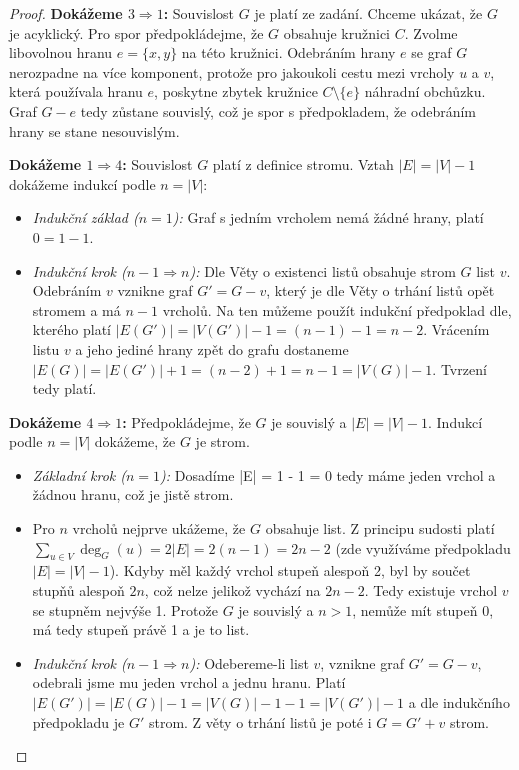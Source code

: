 \begin{proof}
\noindent\textbf{Dokážeme $3 \Rightarrow 1$:}
Souvislost $G$ je platí ze zadání. Chceme ukázat, že $G$ je acyklický. Pro spor předpokládejme, že $G$ obsahuje kružnici $C$. Zvolme libovolnou hranu $e = \{x, y\}$ na této kružnici. Odebráním hrany $e$ se graf $G$ nerozpadne na více komponent, protože pro jakoukoli cestu mezi vrcholy $u$ a $v$, která používala hranu $e$, poskytne zbytek kružnice $C \setminus \{e\}$ náhradní obchůzku. Graf $G - e$ tedy zůstane souvislý, což je spor s předpokladem, že odebráním hrany se stane nesouvislým. 

\bigskip

\noindent\textbf{Dokážeme $1 \Rightarrow 4$:}
Souvislost $G$ platí z definice stromu. Vztah $|E| = |V| - 1$ dokážeme indukcí podle $n = |V|$:
\begin{itemize}
    \item \textit{Indukční základ ($n = 1$):} Graf s jedním vrcholem nemá žádné hrany, platí $0 = 1 - 1$.
    \item \textit{Indukční krok ($n - 1 \Rightarrow n$):} Dle Věty o existenci listů obsahuje strom $G$ list $v$. Odebráním $v$ vznikne graf $G' = G - v$, který je dle Věty o trhání listů opět stromem a má $n - 1$ vrcholů.  Na ten můžeme použít indukční předpoklad dle, kterého platí $|E(G')| = |V(G')| - 1 = (n - 1) - 1 = n - 2$. Vrácením listu $v$ a jeho jediné hrany zpět do grafu dostaneme $|E(G)| = |E(G')| + 1 = (n - 2) + 1 = n - 1 = |V(G)| - 1$. Tvrzení tedy platí.
\end{itemize} \bigskip

\noindent\textbf{Dokážeme $4 \Rightarrow 1$:}
Předpokládejme, že $G$ je souvislý a $|E| = |V| - 1$. Indukcí podle $n = |V|$ dokážeme, že $G$ je strom.
\begin{itemize}
    \item \textit{Základní krok ($n = 1$):} Dosadíme |E| = 1 - 1 = 0 tedy máme jeden vrchol a žádnou hranu, což je jistě strom.
    \item Pro $n$ vrcholů nejprve ukážeme, že $G$ obsahuje list. Z principu sudosti platí $\sum_{u \in V} \deg_G(u) = 2|E| = 2(n - 1) = 2n - 2$ (zde využíváme předpokladu $|E| = |V| - 1$). Kdyby měl každý vrchol stupeň alespoň 2, byl by součet stupňů alespoň $2n$, což nelze jelikož vychází na $2n - 2$. Tedy existuje vrchol $v$ se stupněm nejvýše 1. Protože $G$ je souvislý a $n > 1$, nemůže mít stupeň 0, má tedy stupeň právě 1 a je to list. 
    \item \textit{Indukční krok ($n - 1 \Rightarrow n$):} Odebereme-li list $v$, vznikne graf $G' = G - v$, odebrali jsme mu jeden vrchol a jednu hranu. Platí $|E(G')| = |E(G)| - 1 = |V(G)| - 1 - 1 = |V(G')| - 1$ a dle indukčního předpokladu je $G'$ strom. Z věty o trhání listů je poté i $G = G' + v$ strom.
\end{itemize}
\end{proof} \bigskip

